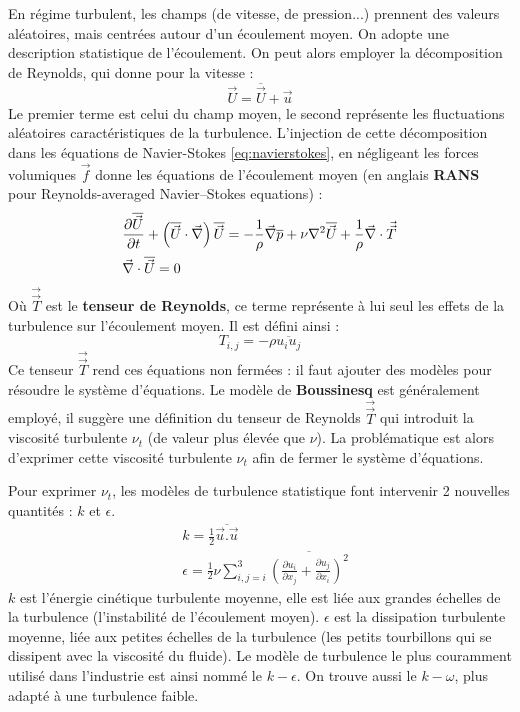 En régime turbulent, les champs (de vitesse, de pression...) prennent des valeurs aléatoires, mais centrées autour d'un écoulement moyen. On adopte une description statistique de l'écoulement. On peut alors employer la décomposition de Reynolds, qui donne pour la vitesse :
%
\begin{equation}
    \vec{U} = \overline{\vec{U}} + \vec{u}
\end{equation}
%
Le premier terme est celui du champ moyen, le second représente les fluctuations aléatoires caractéristiques de la turbulence. L'injection de cette décomposition dans les équations de Navier-Stokes \eqref{eq:navierstokes}, en négligeant les forces volumiques $\vec{f}$ donne les équations de l'écoulement moyen (en anglais \textbf{RANS} pour Reynolds-averaged Navier–Stokes equations) :
%
\begin{align}[left=\empheqlbrace]
    & \frac{ \partial\overline{\vec{U}} }{ \partial t }
    + \left( \overline{\vec{U}} \cdot \vec{\nabla} \right) \overline{\vec{U}}
    = - \frac{1}{\rho} \vec{\nabla} \overline{p}
    + \nu  \nabla^2 \overline{\vec{U}}
    + \frac{1}{\rho} \vec{\nabla} \cdot \vec{\vec{T}} \\
    \notag & \vec{\nabla} \cdot \overline{\vec{U}} = 0
\end{align}
%
Où $\vec{\vec{T}}$ est le \textbf{tenseur de Reynolds}, ce terme représente à lui seul les effets de la turbulence sur l'écoulement moyen. Il est défini ainsi :
%
\begin{equation}
    T_{i,j} = - \rho \overline{u_i u_j}
\end{equation}
%
Ce tenseur $\vec{\vec{T}}$ rend ces équations non fermées : il faut ajouter des modèles pour résoudre le système d'équations. Le modèle de \textbf{Boussinesq} est généralement employé, il suggère une définition du tenseur de Reynolds $\vec{\vec{T}}$ qui introduit la viscosité turbulente $\nu_t$ (de valeur plus élevée que $\nu$). La problématique est alors d'exprimer cette viscosité turbulente $\nu_t$ afin de fermer le système d'équations.

Pour exprimer $\nu_t$, les modèles de turbulence statistique font intervenir 2 nouvelles quantités : $k$ et $\epsilon$.
%
\begin{align}
    & k = \frac{1}{2} \overline{\vec{u}.\vec{u}} \\
    & \epsilon = \frac{1}{2} \nu \sum\limits_{i,j=i}^3 \overline{\left(
    \frac{ \partial u_i }{ \partial x_j }
    + \frac{ \partial u_j }{ \partial x_i } \right)^2}
\end{align}
%
$k$ est l'énergie cinétique turbulente moyenne, elle est liée aux grandes échelles de la turbulence (l'instabilité de l'écoulement moyen). $\epsilon$ est la dissipation turbulente moyenne, liée aux petites échelles de la turbulence (les petits tourbillons qui se dissipent avec la viscosité du fluide). Le modèle de turbulence le plus couramment utilisé dans l'industrie est ainsi nommé le $k - \epsilon$. On trouve aussi le $k - \omega$, plus adapté à une turbulence faible.

